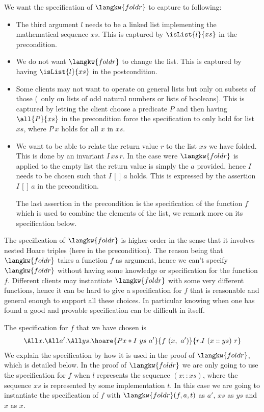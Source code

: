 We want the specification of $\langkw{foldr}$ to capture to following:
\begin{itemize}
\item The third argument $l$ needs to be a linked list implementing the mathematical sequence $xs$.
  This is captured by $\isList {l} {xs}$ in the precondition.
\item We do not want $\langkw{foldr}$ to change the list.
  This is captured by having $\isList {l} {xs}$ in the postcondition.
\item Some clients may not want to operate on general lists but only on subsets of those (\eg{}~only on lists of odd natural numbers or lists of booleans).
  This is captured by letting the client choose a predicate $P$ and then having $\all {P} {xs}$ in the precondition force the specification to only hold for list $xs$, where $P \ x$ holds for all $x$ in $xs$.
\item We want to be able to relate the return value $r$ to the list $xs$ we have folded.
  This is done by an invariant $I\, xs\, r$.
  In the case were $\langkw{foldr}$ is applied to the empty list the return value is simply the $a$ provided, hence $I$ needs to be chosen such that $I \, [] \, a$ holds.
  This is expressed by the assertion $I\, []\, a$ in the precondition.

  The last assertion in the precondition is the specification of the function $f$ which is used to combine the elements of the list, we remark more on its specification below.
\end{itemize}
The specification of $\langkw{foldr}$ is higher-order in the sense that it involves nested Hoare triples (here in the precondition).
The reason being that $\langkw{foldr}$ takes a function $f$ as argument, hence we can't specify $\langkw{foldr}$ without having some knowledge or specification for the function $f$.
Different clients may instantiate $\langkw{foldr}$ with some very different functions, hence it can be hard to give a specification for $f$ that is reasonable and general enough to support all these choices.
In particular knowing when one has found a good and provable specification can be difficult in itself.

The specification for $f$ that we have chosen is
\begin{align*}
\All x. \All a'. \All ys. \hoare{P x \ast I \ ys \ a'}{f \ (x, \ a')}{r. I\ (x::ys)\   r}
\end{align*}
We explain the specification by how it is used in the proof of $\langkw{foldr}$, which is detailed below.
In the proof of $\langkw{foldr}$ we are only going to use the specification for $f$ when $l$ represents the sequence $(x::xs)$, where the sequence $xs$ is represented by some implementation $t$.
In this case we are going to instantiate the specification of $f$ with $\langkw{foldr}(f, a, t)$ as $a'$, $xs$ as $ys$ and $x$ as $x$.

